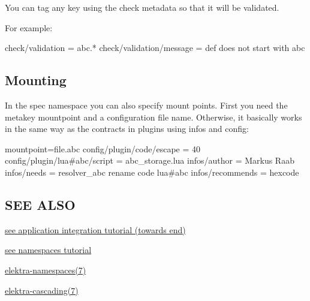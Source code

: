 You can tag any key using the {\ttfamily check} metadata so that it will be validated.

For example\+:


\begin{DoxyCode}
check/validation = abc.*
check/validation/message = def does not start with abc
\end{DoxyCode}


\subsection*{Mounting}

In the spec namespace you can also specify mount points. First you need the metakey {\ttfamily mountpoint} and a configuration file name. Otherwise, it basically works in the same way as the contracts in plugins using {\ttfamily infos} and {\ttfamily config}\+:


\begin{DoxyCode}
[]
mountpoint=file.abc
config/plugin/code/escape = 40
config/plugin/lua#abc/script = abc\_storage.lua
infos/author = Markus Raab
infos/needs = resolver\_abc rename code lua#abc
infos/recommends = hexcode
\end{DoxyCode}


\subsection*{S\+EE A\+L\+SO}


\begin{DoxyItemize}
\item \hyperlink{doc_tutorials_application-integration_md}{see application integration tutorial (towards end)}
\item \hyperlink{doc_tutorials_namespaces_md}{see namespaces tutorial}
\item \hyperlink{doc_help_elektra-namespaces_md}{elektra-\/namespaces(7)}
\item \hyperlink{doc_help_elektra-cascading_md}{elektra-\/cascading(7)} 
\end{DoxyItemize}